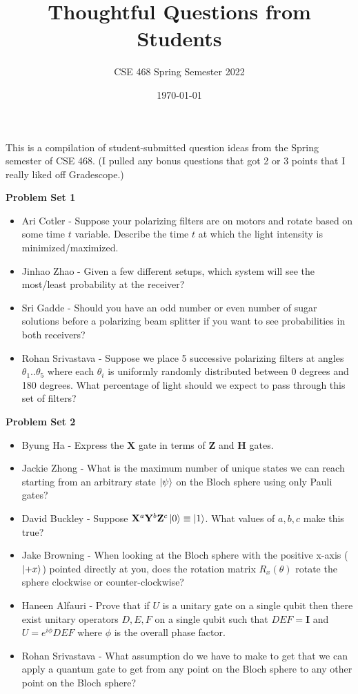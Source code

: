 \documentclass[12pt]{article}
\title{Thoughtful Questions from Students}
\author{CSE 468 Spring Semester 2022}
\date{\today}
\begin{document}
\maketitle

\noindent This is a compilation of student-submitted question ideas from the Spring semester of CSE 468. (I pulled any bonus questions that got 2 or 3 points that I really liked off Gradescope.)

\noindent \textbf{Problem Set 1}
\begin{itemize}
    \item Ari Cotler - Suppose your polarizing filters are on motors and rotate based on some time $t$ variable. Describe the time $t$ at which the light intensity is minimized/maximized.
    \item Jinhao Zhao - Given a few different setups, which system will see the most/least probability at the receiver?
    \item Sri Gadde - Should you have an odd number or even number of sugar solutions before a polarizing beam splitter if you want to see probabilities in both receivers?
    \item Rohan Srivastava - Suppose we place 5 successive polarizing filters at angles $\theta_{1} .. \theta_{5}$ where each $\theta_{i}$ is uniformly randomly distributed between 0 degrees and 180 degrees. What percentage of light should we expect to pass through this set of filters?
\end{itemize}
\noindent \textbf{Problem Set 2}
\begin{itemize}
    \item Byung Ha - Express the $\mathbf{X}$ gate in terms of $\mathbf{Z}$ and $\mathbf{H}$ gates.
    \item Jackie Zhong - What is the maximum number of unique states we can reach starting from an arbitrary state $\ket{\psi}$ on the Bloch sphere using only Pauli gates?
    \item David Buckley - Suppose $\mathbf{X}^{a}\mathbf{Y}^{b}\mathbf{Z}^{c}\ket{0} \equiv \ket{1}$. What values of $a,b,c$ make this true?
    \item Jake Browning - When looking at the Bloch sphere with the positive x-axis ($\ket{+x}$) pointed directly at you, does the rotation matrix $R_{x}(\theta)$ rotate the sphere clockwise or counter-clockwise?
    \item Haneen Alfauri - Prove that if $U$ is a unitary gate on a single qubit then there exist unitary operators $D,E,F$ on a single qubit such that $DEF = \mathbf{I}$ and $U = e^{i\phi}DEF$ where $\phi$ is the overall phase factor.
    \item Rohan Srivastava - What assumption do we have to make to get that we can apply a quantum gate to get from any point on the Bloch sphere to any other point on the Bloch sphere?
\end{itemize}
\end{document}
